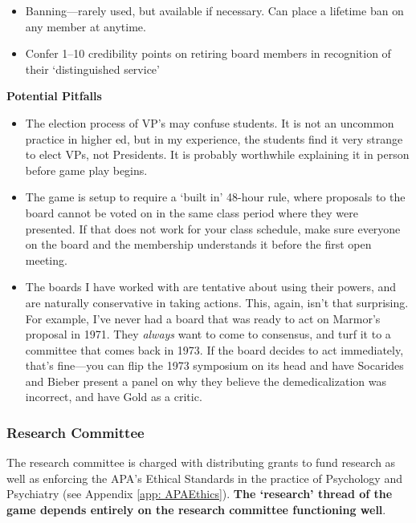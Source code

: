 \begin{refsection}
\begin{itemize}
\item Banning---rarely used, but available if necessary. Can place a lifetime ban on any member at anytime.

\item Confer 1--10 credibility points on retiring board members in recognition of their ‘distinguished service’

\end{itemize}

\textbf{Potential Pitfalls}

\begin{itemize}
\item The election process of VP's may confuse students. It is not an uncommon practice in higher ed, but in my experience, the students find it very strange to elect VPs, not Presidents. It is probably worthwhile explaining it in person before game play begins.

\item The game is setup to require a `built in' 48-hour rule, where proposals to the board cannot be voted on in the same class period where they were presented. If that does not work for your class schedule, make sure everyone on the board and the membership understands it before the first open meeting.

\item The boards I have worked with are tentative about using their powers, and are naturally conservative in taking actions. This, again, isn't that surprising. For example, I've never had a board that was ready to act on Marmor's proposal in 1971. They \emph{always} want to come to consensus, and turf it to a committee that comes back in 1973. If the board decides to act immediately, that's fine---you can flip the 1973 symposium on its head and have Socarides and Bieber present a panel on why they believe the demedicalization was incorrect, and have Gold as a critic.

\end{itemize}

\subsubsection{Research Committee}
\label{researchcommittee}

The research committee is charged with distributing grants to fund research as well as enforcing the APA's Ethical Standards in the practice of Psychology and Psychiatry (see Appendix \ref{app: APAEthics}). \textbf{The ‘research’ thread of the game depends entirely on the research committee functioning well}. 


\end{refsection}
